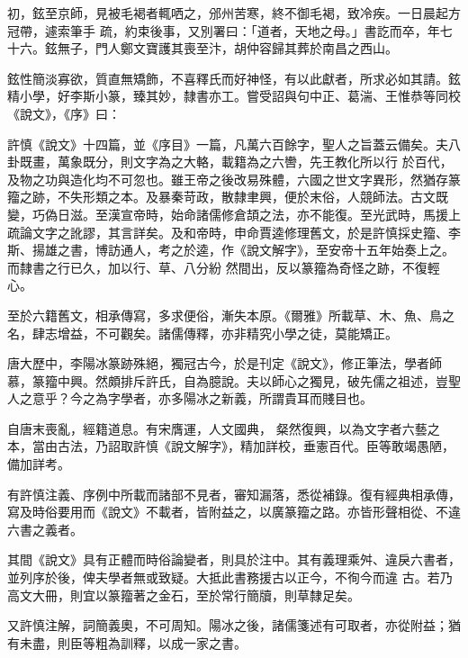 \begin{pinyinscope}
 初，鉉至京師，見被毛褐者輒哂之，邠州苦寒，終不御毛褐，致冷疾。一日晨起方冠帶，遽索筆手
 疏，約束後事，又別署曰：「道者，天地之母。」書訖而卒，年七十六。鉉無子，門人鄭文寶護其喪至汴，胡仲容歸其葬於南昌之西山。



 鉉性簡淡寡欲，質直無矯飾，不喜釋氏而好神怪，有以此獻者，所求必如其請。鉉精小學，好李斯小篆，臻其妙，隸書亦工。嘗受詔與句中正、葛湍、王惟恭等同校《說文》，《序》曰：



 許慎《說文》十四篇，並《序目》一篇，凡萬六百餘字，聖人之旨蓋云備矣。夫八卦既畫，萬象既分，則文字為之大輅，載籍為之六轡，先王教化所以行
 於百代，及物之功與造化均不可忽也。雖王帝之後改易殊體，六國之世文字異形，然猶存篆籀之跡，不失形類之本。及暴秦苛政，散隸聿興，便於末俗，人競師法。古文既變，巧偽日滋。至漢宣帝時，始命諸儒修倉頡之法，亦不能復。至光武時，馬援上疏論文字之訛謬，其言詳矣。及和帝時，申命賈逵修理舊文，於是許慎採史籀、李斯、揚雄之書，博訪通人，考之於逵，作《說文解字》，至安帝十五年始奏上之。而隸書之行已久，加以行、草、八分紛
 然間出，反以篆籀為奇怪之跡，不復輕心。



 至於六籍舊文，相承傳寫，多求便俗，漸失本原。《爾雅》所載草、木、魚、鳥之名，肆志增益，不可觀矣。諸儒傳釋，亦非精究小學之徒，莫能矯正。



 唐大歷中，李陽冰篆跡殊絕，獨冠古今，於是刊定《說文》，修正筆法，學者師慕，篆籀中興。然頗排斥許氏，自為臆說。夫以師心之獨見，破先儒之祖述，豈聖人之意乎？今之為字學者，亦多陽冰之新義，所謂貴耳而賤目也。



 自唐末喪亂，經籍道息。有宋膺運，人文國典，
 粲然復興，以為文字者六藝之本，當由古法，乃詔取許慎《說文解字》，精加詳校，垂憲百代。臣等敢竭愚陋，備加詳考。



 有許慎注義、序例中所載而諸部不見者，審知漏落，悉從補錄。復有經典相承傳，寫及時俗要用而《說文》不載者，皆附益之，以廣篆籀之路。亦皆形聲相從、不違六書之義者。



 其間《說文》具有正體而時俗論變者，則具於注中。其有義理乘舛、違戾六書者，並列序於後，俾夫學者無或致疑。大抵此書務援古以正今，不徇今而違
 古。若乃高文大冊，則宜以篆籀著之金石，至於常行簡牘，則草隸足矣。



 又許慎注解，詞簡義奧，不可周知。陽冰之後，諸儒箋述有可取者，亦從附益；猶有未盡，則臣等粗為訓釋，以成一家之書。




\end{pinyinscope}
